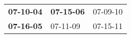 \begin{supertabular}{p{0.33\columnwidth}p{0.33\columnwidth}p{0.33\columnwidth}}
 \textbf{07-10-04\textsuperscript{}} &  \textbf{07-15-06\textsuperscript{}} &  07-09-10\textsuperscript{} \\
 \textbf{07-16-05\textsuperscript{}} &           07-11-09\textsuperscript{} &  07-15-11\textsuperscript{} \\
\end{supertabular}

